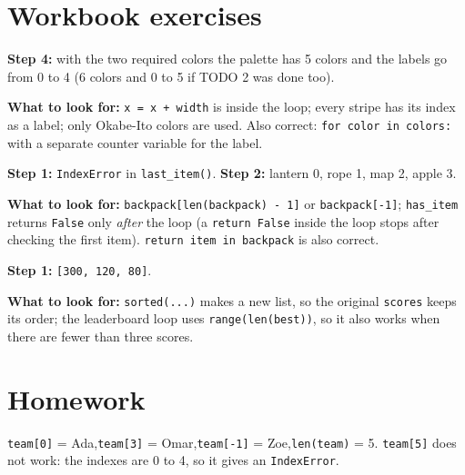 
\section{Workbook exercises}
\begin{answer}
\textbf{Step 4:} with the two required colors the palette has 5 colors and the labels go from 0 to 4
(6 colors and 0 to 5 if TODO 2 was done too).\par
\textbf{What to look for:} \texttt{x = x + width} is inside the loop; every stripe has its index as a label; only Okabe-Ito colors are used.
Also correct: \texttt{for color in colors:} with a separate counter variable for the label.
\end{answer}

\begin{answer}
\textbf{Step 1:} \texttt{IndexError} in \texttt{last\_item()}.\quad
\textbf{Step 2:} lantern 0, rope 1, map 2, apple 3.\par
\textbf{What to look for:} \texttt{backpack[len(backpack) - 1]} or \texttt{backpack[-1]}; \texttt{has\_item} returns \texttt{False}
only \emph{after} the loop (a \texttt{return False} inside the loop stops after checking the first item).
\texttt{return item in backpack} is also correct.
\end{answer}

\begin{answer}
\textbf{Step 1:} \texttt{[300, 120, 80]}.\par
\textbf{What to look for:} \texttt{sorted(...)} makes a new list, so the original \texttt{scores} keeps its order;
the leaderboard loop uses \texttt{range(len(best))}, so it also works when there are fewer than three scores.
\end{answer}

\section{Homework}
\begin{answer}
\texttt{team[0]} = Ada,\quad \texttt{team[3]} = Omar,\quad \texttt{team[-1]} = Zoe,\quad \texttt{len(team)} = 5.
\texttt{team[5]} does not work: the indexes are 0 to 4, so it gives an \texttt{IndexError}.
\end{answer}

